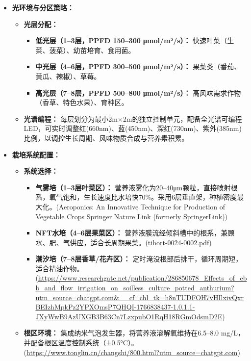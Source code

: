 \begin{itemize}
\item
  \textbf{光环境与分区策略：}

  \begin{itemize}
  \item
    \textbf{光层分配：}

    \begin{itemize}
    \item
      \textbf{低光层（1--3层，PPFD 150--300 μmol/m²/s）：} 快速叶菜（生菜、菠菜）、幼苗培育、食用菌。
    \item
      \textbf{中光层（4--6层，PPFD 300--500 μmol/m²/s）：} 果菜类（番茄、黄瓜、辣椒）、草莓。
    \item
      \textbf{高光层（7--8层，PPFD 500--800 μmol/m²/s）：} 高风味需求作物（香草、特色水果）、育种区。
    \end{itemize}
  \item
    \textbf{光谱编程：} 每层划分为最小2m×2m的独立控制单元，配备全光谱可编程LED，可实时调整红(660nm)、蓝(450nm)、深红(730nm)、紫外(385nm)比例，以调控生长周期、风味物质合成与营养素积累。
  \end{itemize}
\item
  \textbf{栽培系统配置：}

  \begin{itemize}
  \item
    \textbf{系统选择：}

    \begin{itemize}
    \item
      \textbf{气雾培（1--3层叶菜区）：} 营养液雾化为20--40μm颗粒，直接喷射根系，氧气饱和，生长速度比水培快70\%。采用6层垂直架，种植密度最大化。(Aeroponics: An Innovative Technique for Production of Vegetable Crops \textbar{} Springer Nature Link (formerly SpringerLink))
    \item
      \textbf{NFT水培（4--6层果菜区）：} 营养液膜流经倾斜槽中的根系，兼顾水、肥、气供应，适合长周期果菜。(tihort-0024-0002.pdf)
    \item
      \textbf{潮汐培（7--8层香草/花卉区）：} 定时淹没根部后排干，循环周期短，适合精油作物。
(\url{https://www.researchgate.net/publication/286850678\_Effects\_of\_ebb\_and\_flow\_irrigation\_on\_soilless\_culture\_potted\_anthurium?utm\_source=chatgpt.com\&\_\_cf\_chl\_tk=h8nTUDFOH7vHIlxivQxrBEIzhMpkPz2YPXOmsP7QHQI-1766838437-1.0.1.1-JXyWwB9AzUXGB3B63Cn7LzxpubO1RqH18RGmOdsmD2E})
    \end{itemize}
  \item
    \textbf{根区环境：} 集成纳米气泡发生器，将营养液溶解氧维持在6.5--8.0 mg/L，并配备根区温度控制系统（±0.5°C）。
(\url{https://www.tonglin.cn/changshi/800.html?utm\_source=chatgpt.com})
  \end{itemize}
\end{itemize}


